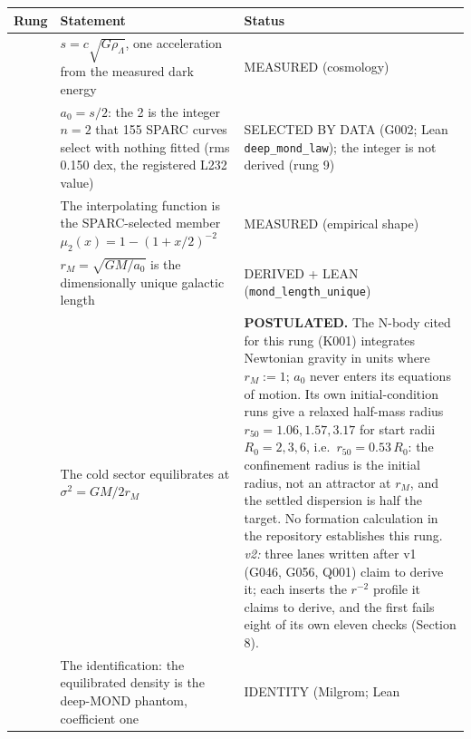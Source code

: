 \documentclass[
  11pt,
]{article}
\newcounter{none} %
\begin{document}
{\def\LTcaptype{none} %
\begin{longtable}[]{@{}
  >{\raggedright\arraybackslash}p{}
  >{\raggedright\arraybackslash}p{}
  >{\raggedright\arraybackslash}p{}@{}}
\toprule\noalign{}
\begin{minipage}[b]{\linewidth}\raggedright
Rung
\end{minipage} & \begin{minipage}[b]{\linewidth}\raggedright
Statement
\end{minipage} & \begin{minipage}[b]{\linewidth}\raggedright
Status
\end{minipage} \\
\midrule\noalign{}
\endhead
\bottomrule\noalign{}
\endlastfoot
0 & \(s = c\sqrt{G\rho_\Lambda}\), one acceleration from the measured
dark energy & MEASURED (cosmology) \\
1 & \(a_0 = s/2\): the 2 is the integer \(n = 2\) that 155 SPARC curves
select with nothing fitted (rms 0.150 dex, the registered L232 value) &
SELECTED BY DATA (G002; Lean \texttt{deep\_mond\_law}); the integer is
not derived (rung 9) \\
2 & The interpolating function is the SPARC-selected member
\(\mu_2(x) = 1 - (1 + x/2)^{-2}\) & MEASURED (empirical shape) \\
3 & \(r_M = \sqrt{GM/a_0}\) is the dimensionally unique galactic length
& DERIVED + LEAN (\texttt{mond\_length\_unique}) \\
4 & The cold sector equilibrates at \(\sigma^2 = GM/2r_M\) &
\textbf{POSTULATED.} The N-body cited for this rung (K001) integrates
Newtonian gravity in units where \(r_M := 1\); \(a_0\) never enters its
equations of motion. Its own initial-condition runs give a relaxed
half-mass radius \(r_{50} = 1.06, 1.57, 3.17\) for start radii
\(R_0 = 2, 3, 6\), i.e.~\(r_{50} = 0.53\,R_0\): the confinement radius
is the initial radius, not an attractor at \(r_M\), and the settled
dispersion is half the target. No formation calculation in the
repository establishes this rung. \emph{v2:} three lanes written after
v1 (G046, G056, Q001) claim to derive it; each inserts the \(r^{-2}\)
profile it claims to derive, and the first fails eight of its own eleven
checks (Section 8). \\
5 & The identification: the equilibrated density is the deep-MOND
phantom, coefficient one & IDENTITY (Milgrom; Lean

\end{longtable}}
\end{document}
